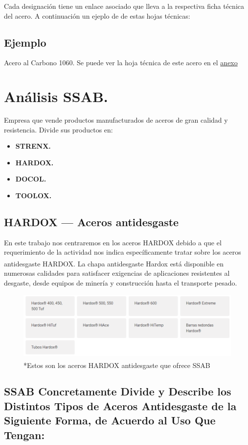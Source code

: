 \documentclass[12pt,a4paper]{article}
\begin{document}
Cada designación tiene un enlace asociado que lleva a la respectiva ficha técnica del acero.
A continuación un ejeplo de de estas hojas técnicas:

\subsection*{Ejemplo}
Acero al Carbono 1060. Se puede ver la hoja técnica de este acero en el \hyperref[anexo]{anexo}
\section{Análisis SSAB.}
Empresa que vende productos manufacturados de aceros de gran calidad y resistencia. Divide sus productos en:
\begin{itemize}
    \item \textbf{STRENX.}
    \item \textbf{HARDOX.}
    \item \textbf{DOCOL.}
    \item \textbf{TOOLOX.}
\end{itemize}

\subsection{HARDOX — Aceros antidesgaste}
En este trabajo nos centraremos en los aceros HARDOX debido a que el  requerimiento de la actividad nos indica específicamente tratar sobre los aceros antidesgaste HARDOX.
La chapa antidesgaste Hardox\textsuperscript{\textregistered} está disponible en numerosas calidades para satisfacer exigencias de aplicaciones resistentes al desgaste, desde equipos de minería y construcción hasta el transporte pesado.

\begin{figure}[H]    
    \centering         
    \includegraphics[width=1\textwidth]{Inagenes para latex/25.png}
    \caption*{*Estos son los aceros HARDOX\textsuperscript{\textregistered} antidesgaste que ofrece SSAB}
\end{figure}
\subsection*{SSAB Concretamente Divide y Describe los Distintos Tipos de Aceros Antidesgaste de la Siguiente Forma, de Acuerdo al Uso Que Tengan:}
\end{document}
